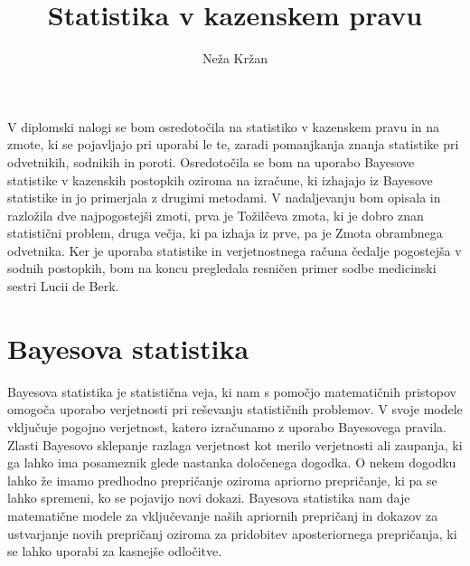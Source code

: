 \documentclass[12pt,a4paper]{amsart}
\theoremstyle{definition} %
\theoremstyle{plain} %
\begin{document}
\title{Statistika v kazenskem pravu}
\author{Neža Kržan}
\maketitle

V diplomski nalogi se bom osredotočila na statistiko v kazenskem pravu in na zmote, ki se pojavljajo pri uporabi le te, zaradi pomanjkanja
znanja statistike pri odvetnikih, sodnikih in poroti. Osredotočila se bom na uporabo Bayesove statistike v kazenskih postopkih oziroma na izračune,
ki izhajajo iz Bayesove statistike in jo primerjala z drugimi metodami. V nadaljevanju bom opisala in razložila dve najpogostejši zmoti, prva
je Tožilčeva zmota, ki je dobro znan statistični problem, druga večja, ki pa izhaja iz prve, pa je Zmota obrambnega odvetnika. Ker je uporaba
statistike in verjetnostnega računa čedalje pogostejša v sodnih postopkih, bom na koncu pregledala resničen primer sodbe medicinski sestri Lucii de Berk.

\section{Bayesova statistika}
Bayesova statistika je statistična veja, ki nam s pomočjo matematičnih pristopov omogoča uporabo verjetnosti pri reševanju statističnih
problemov. V svoje modele vključuje pogojno verjetnost, katero izračunamo z uporabo Bayesovega pravila. \\
 
Zlasti Bayesovo sklepanje razlaga verjetnost kot merilo verjetnosti ali zaupanja, ki ga lahko ima posameznik glede nastanka določenega dogodka.
O nekem dogodku lahko že imamo predhodno prepričanje oziroma apriorno prepričanje, ki pa se lahko spremeni, ko se pojavijo novi dokazi. Bayesova
statistika nam daje matematične modele za vključevanje naših apriornih prepričanj in dokazov za ustvarjanje novih prepričanj oziroma za
pridobitev aposteriornega prepričanja, ki se lahko uporabi za kasnejše odločitve.

\end{document}
